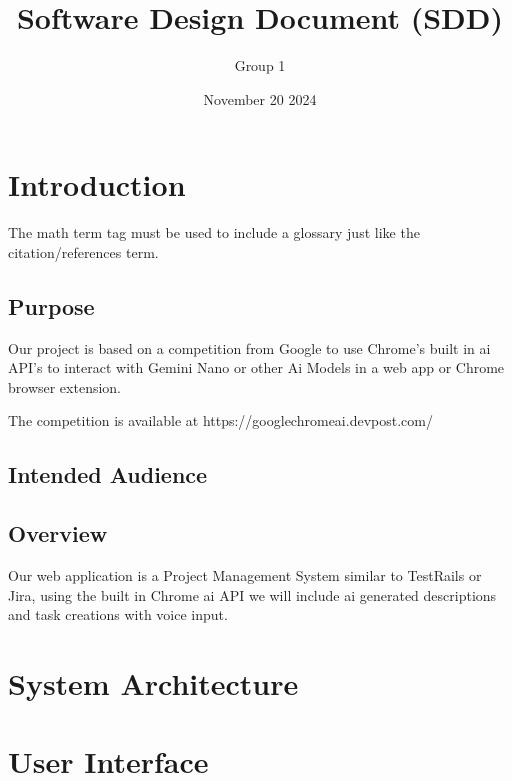 \documentclass{article}
\title{Software Design Document (SDD)}
\author{Group 1 }
\date{November 20 2024}
\begin{document}
\maketitle  
\pagebreak

\tableofcontents
\pagebreak

\section{Introduction}
The \Gls{math} term tag must be used to include a glossary just like the citation/references \gls{term}. 
\subsection{Purpose}
Our project is based on a competition from Google to use Chrome's built in \Gls{ai} API's to interact with Gemini Nano or other Ai Models in a web app or Chrome browser extension. 

The competition is available at https://googlechromeai.devpost.com/

\subsection{Intended Audience}
\lipsum[2]

\subsection{Overview}
Our web application is a Project Management System similar to TestRails or Jira, using the built in Chrome \Gls{ai} API we will include ai generated descriptions and task creations with voice input. 

\section{System Architecture}
 
\section{User Interface}
 

\pagebreak
\printglossaries

\end{document}
